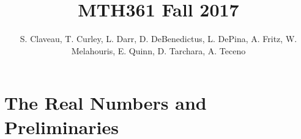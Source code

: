 \documentclass[12pt]{amsbook}
\theoremstyle{plain}
\numberwithin{section}{chapter}
\begin{document}
\title{MTH361 Fall 2017}
\maketitle
\author{S. Claveau, T. Curley, L. Darr, D. DeBenedictus, L. DePina, A. Fritz, W. Melahouris, E. Quinn, D. Tarchara, A. Teceno}
\setcounter{tocdepth}{4} 
\tableofcontents
\mainmatter 
\chapter{The Real Numbers and Preliminaries}



\end{document}
